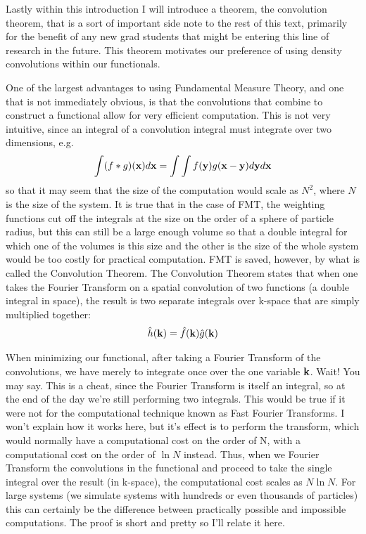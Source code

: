 Lastly within this introduction I will introduce a theorem, the
convolution theorem, that is a sort of important side note to the rest
of this text, primarily for the benefit of any new grad students that
might be entering this line of research in the future.  This theorem
motivates our preference of using density convolutions within our
functionals.

One of the largest advantages to using Fundamental Measure Theory, and
one that is not immediately obvious, is that the convolutions that
combine to construct a functional allow for very efficient
computation.  This is not very intuitive, since an integral of a
convolution integral must integrate over two dimensions, e.g.
\begin{align}
\int(f\ast g)(\textbf{x})d\textbf{x} = \int \int f(\textbf{y})g(\textbf{x}-\textbf{y})d\textbf{y} d\textbf{x}
\end{align}
so that it may seem that the size of the computation would scale as
$N^2$, where $N$ is the size of the system.  It is true that in the
case of FMT, the weighting functions cut off the integrals at the size
on the order of a sphere of particle radius, but this can still be a
large enough volume so that a double integral for which one of the
volumes is this size and the other is the size of the whole system
would be too costly for practical computation.  FMT is saved, however,
by what is called the Convolution Theorem.  The Convolution Theorem
states that when one takes the Fourier Transform on a spatial
convolution of two functions (a double integral in space), the result
is two separate integrals over k-space that are simply multiplied
together:
\begin{align}
\hat{h}(\textbf{k}) = \hat{f}(\textbf{k})\hat{g}(\textbf{k})
\end{align}

When minimizing our functional, after taking a Fourier Transform of
the convolutions, we have merely to integrate once over the one
variable $\textbf{k}$.  Wait!  You may say.  This is a cheat, since the
Fourier Transform is itself an integral, so at the end of the day
we're still performing two integrals.  This would be true if it were
not for the computational technique known as Fast Fourier Transforms.
I won't explain how it works here, but it's effect is to perform the
transform, which would normally have a computational cost on the order
of N, with a computational cost on the order of $\ln N$ instead.
Thus, when we Fourier Transform the convolutions in the functional and
proceed to take the single integral over the result (in k-space), the
computational cost scales as $N \ln N$.  For large systems (we
simulate systems with hundreds or even thousands of particles) this
can certainly be the difference between practically possible and
impossible computations.  The proof is short and pretty so I'll relate
it here.

